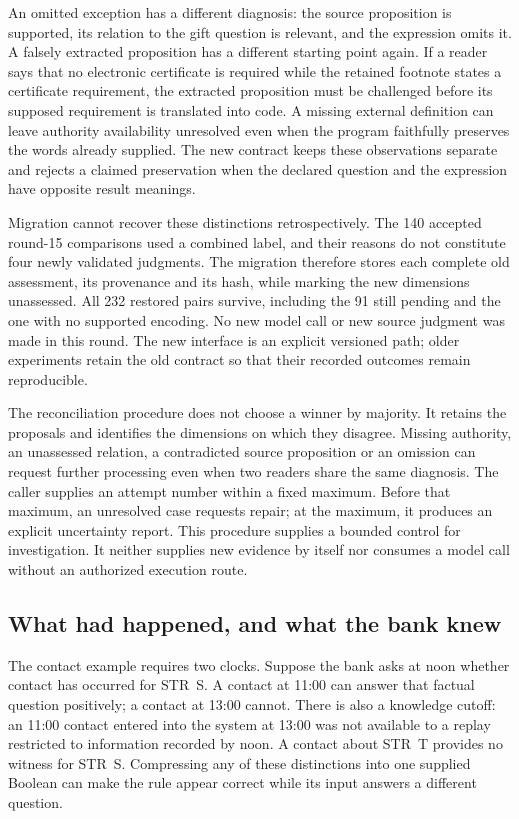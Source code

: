 An omitted exception has a different diagnosis: the source proposition is
supported, its relation to the gift question is relevant, and the expression
omits it. A falsely extracted proposition has a different starting point again.
If a reader says that no electronic certificate is required while the retained
footnote states a certificate requirement, the extracted proposition must be
challenged before its supposed requirement is translated into code. A missing
external definition can leave authority availability unresolved even when the
program faithfully preserves the words already supplied. The new contract
keeps these observations separate and rejects a claimed preservation when the
declared question and the expression have opposite result meanings.

Migration cannot recover these distinctions retrospectively. The 140 accepted
round-15 comparisons used a combined label, and their reasons do not constitute
four newly validated judgments. The migration therefore stores each complete
old assessment, its provenance and its hash, while marking the new dimensions
unassessed. All 232 restored pairs survive, including the 91 still pending and
the one with no supported encoding. No new model call or new source judgment
was made in this round. The new interface is an explicit versioned path; older
experiments retain the old contract so that their recorded outcomes remain
reproducible.

The reconciliation procedure does not choose a winner by majority. It retains
the proposals and identifies the dimensions on which they disagree. Missing
authority, an unassessed relation, a contradicted source proposition or an
omission can request further processing even when two readers share the same
diagnosis. The caller supplies an attempt number within a fixed maximum. Before
that maximum, an unresolved case requests repair; at the maximum, it produces
an explicit uncertainty report. This procedure supplies a bounded control for
investigation. It neither supplies new evidence by itself nor consumes a model
call without an authorized execution route.

\subsection{What had happened, and what the bank knew}

The contact example requires two clocks. Suppose the bank asks at noon whether
contact has occurred for STR~S. A contact at 11:00 can answer that factual
question positively; a contact at 13:00 cannot. There is also a knowledge
cutoff: an 11:00 contact entered into the system at 13:00 was not available to a
replay restricted to information recorded by noon. A contact about STR~T
provides no witness for STR~S. Compressing any of these distinctions into one
supplied Boolean can make the rule appear correct while its input answers a
different question.

